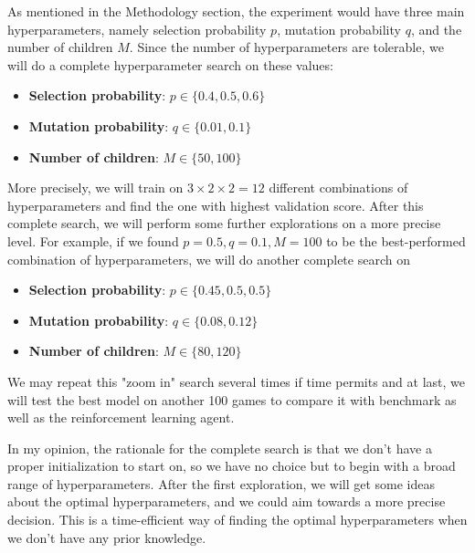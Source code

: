 \documentclass[letterpaper]{article} %
\begin{document}
\begin{itemize}
  As mentioned in the Methodology section, the experiment would have three main hyperparameters, namely selection probability $p$, mutation probability $q$, and the number of children $M$. Since the number of hyperparameters are tolerable, we will do a complete hyperparameter search on these values:
  \begin{itemize}
  \item {\bf Selection probability}: $p\in\{0.4,0.5,0.6\}$
  \item {\bf Mutation probability}: $q \in \{0.01, 0.1\}$
  \item {\bf Number of children}: $M \in \{50, 100\}$
  \end{itemize}
  More precisely, we will train on $3\times 2\times 2 = 12$ different combinations of hyperparameters and find the one with highest validation score. After this complete search, we will perform some further explorations on a more precise level. For example, if we found $p=0.5,q=0.1,M=100$ to be the best-performed combination of hyperparameters, we will do another complete search on 
  \begin{itemize}
  \item {\bf Selection probability}: $p\in\{0.45,0.5,0.5\}$
  \item {\bf Mutation probability}: $q \in \{0.08, 0.12\}$
  \item {\bf Number of children}: $M \in \{80, 120\}$
  \end{itemize}
  We may repeat this "zoom in" search several times if time permits and at last, we will test the best model on another 100 games to compare it with benchmark as well as the reinforcement learning agent.

  In my opinion, the rationale for the complete search is that we don't have a proper initialization to start on, so we have no choice but to begin with a broad range of hyperparameters. After the first exploration, we will get some ideas about the optimal hyperparameters, and we could aim towards a more precise decision. This is a time-efficient way of finding the optimal hyperparameters when we don't have any prior knowledge.

  

\end{itemize}
\end{document}
